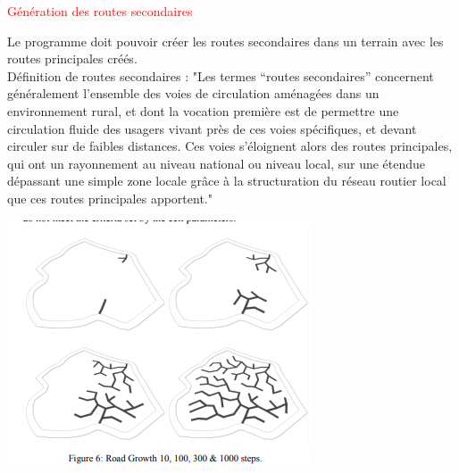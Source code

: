 \newpage

\besoin{}
    {\textcolor{red}{Génération des routes secondaires}}
    { Le programme doit pouvoir créer les routes secondaires dans un terrain avec les routes principales créés. \\
    Définition de routes secondaires : "Les termes “routes secondaires” concernent généralement l’ensemble des voies de circulation aménagées dans un environnement rural, et dont la vocation première est de permettre une circulation fluide des usagers vivant près de ces voies spécifiques, et devant circuler sur de faibles distances. Ces voies s’éloignent alors des routes principales, qui ont un rayonnement au niveau national ou niveau local, sur une étendue dépassant une simple zone locale grâce à la structuration du réseau routier local que ces routes principales apportent." \cite{routeSecondaire}
    \begin{center}
        \centering
        \includegraphics[height = 5 cm]{images/routes_secondaires.png}\\
    \end{center}
    }
{}
